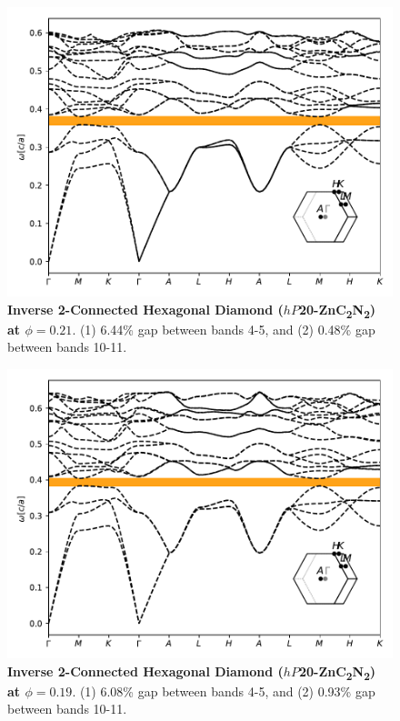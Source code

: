 \documentclass[fleqn,amsmath,amssymb,superscriptaddress, reprint,prl]{revtex4-1}
\begin{document}
\begin{figure}
\includegraphics[width=0.9\linewidth]{workspace/2b9aec77d79009ed5fcccaa2dd99c77a/images/r=37.pdf}
	\caption{\textbf{Inverse 2-Connected Hexagonal Diamond ($hP$20-ZnC\textsubscript{2}N\textsubscript{2}) at $\phi=0.21$}. (1) 6.44\% gap between bands 4-5, and (2) 0.48\% gap between bands 10-11.}
\end{figure}

\begin{figure}
\includegraphics[width=0.9\linewidth]{workspace/2b9aec77d79009ed5fcccaa2dd99c77a/images/r=38.pdf}
	\caption{\textbf{Inverse 2-Connected Hexagonal Diamond ($hP$20-ZnC\textsubscript{2}N\textsubscript{2}) at $\phi=0.19$}. (1) 6.08\% gap between bands 4-5, and (2) 0.93\% gap between bands 10-11.}
\end{figure}
\end{document}
